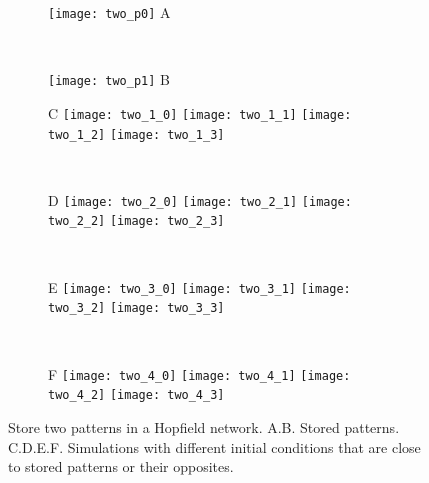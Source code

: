 \begin{figure}[H]
  \centering
  \begin{minipage}{0.275\textwidth}
    \begin{subfigure}{\textwidth}
      \centering
      \texttt{[image: two\_p0]}
      \textsf{A}
    \end{subfigure}\\[0.3em]
    \begin{subfigure}{\textwidth}
      \centering
      \texttt{[image: two\_p1]}
      \textsf{B}
    \end{subfigure}
  \end{minipage}
  \hspace{0.7em}
  \begin{minipage}{0.62\textwidth}
    \begin{subfigure}{\textwidth}
      \textsf{C}
      \centering
      \texttt{[image: two\_1\_0]}
      \texttt{[image: two\_1\_1]}
      \texttt{[image: two\_1\_2]}
      \texttt{[image: two\_1\_3]}
    \end{subfigure}\\[0.8em]
    \begin{subfigure}{\textwidth}
      \textsf{D}
      \centering
      \texttt{[image: two\_2\_0]}
      \texttt{[image: two\_2\_1]}
      \texttt{[image: two\_2\_2]}
      \texttt{[image: two\_2\_3]}
    \end{subfigure}\\[0.8em]
    \begin{subfigure}{\textwidth}
      \textsf{E}
      \centering
      \texttt{[image: two\_3\_0]}
      \texttt{[image: two\_3\_1]}
      \texttt{[image: two\_3\_2]}
      \texttt{[image: two\_3\_3]}
    \end{subfigure}\\[0.8em]
    \begin{subfigure}{\textwidth}
      \textsf{F}
      \centering
      \texttt{[image: two\_4\_0]}
      \texttt{[image: two\_4\_1]}
      \texttt{[image: two\_4\_2]}
      \texttt{[image: two\_4\_3]}
    \end{subfigure}
  \end{minipage}
  \vspace{1.2em}
  \caption{Store two patterns in a Hopfield network.
           \textsf{A.B.} Stored patterns.
           \textsf{C.D.E.F.} Simulations with different initial conditions
           that are close to stored patterns or their opposites.}
  \label{fig: Hopfield_two}
\end{figure}
\vfill

